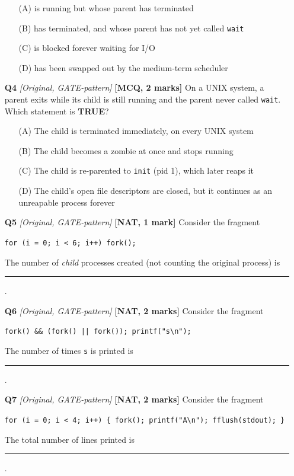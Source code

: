 \documentclass[11pt]{article}
\begin{document}
\begin{enumerate}
\begin{enumerate}
  \item[(A)] is running but whose parent has terminated
  \item[(B)] has terminated, and whose parent has not yet called \texttt{wait}
  \item[(C)] is blocked forever waiting for I/O
  \item[(D)] has been swapped out by the medium-term scheduler
\end{enumerate}

\item[\textbf{Q4}] \textit{[Original, GATE-pattern]} \textbf{[MCQ, 2 marks]} On a UNIX system, a parent exits while its child is still running and the parent never called \texttt{wait}. Which statement is \textbf{TRUE}?

\begin{enumerate}
  \item[(A)] The child is terminated immediately, on every UNIX system
  \item[(B)] The child becomes a zombie at once and stops running
  \item[(C)] The child is re-parented to \texttt{init} (pid 1), which later reaps it
  \item[(D)] The child's open file descriptors are closed, but it continues as an unreapable process forever
\end{enumerate}

\item[\textbf{Q5}] \textit{[Original, GATE-pattern]} \textbf{[NAT, 1 mark]} Consider the fragment
\begin{center}\texttt{for (i = 0; i < 6; i++) fork();}\end{center}
The number of \emph{child} processes created (not counting the original process) is \rule{1.5cm}{0.4pt}.

\item[\textbf{Q6}] \textit{[Original, GATE-pattern]} \textbf{[NAT, 2 marks]} Consider the fragment
\begin{center}\texttt{fork() \&\& (fork() || fork()); printf("s\textbackslash n");}\end{center}
The number of times \texttt{s} is printed is \rule{1.5cm}{0.4pt}.

\item[\textbf{Q7}] \textit{[Original, GATE-pattern]} \textbf{[NAT, 2 marks]} Consider the fragment
\begin{center}\texttt{for (i = 0; i < 4; i++) \{ fork(); printf("A\textbackslash n"); fflush(stdout); \}}\end{center}
The total number of lines printed is \rule{1.5cm}{0.4pt}.


\end{enumerate}
\end{document}
